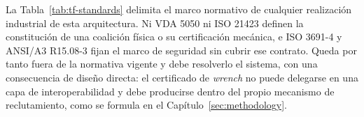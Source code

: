 

La Tabla~\ref{tab:tf-standards} delimita el marco normativo de cualquier realización
industrial de esta arquitectura. Ni VDA 5050 ni ISO 21423 definen la constitución de una
coalición física o su certificación mecánica, e ISO 3691-4 y ANSI/A3 R15.08-3 fijan el
marco de seguridad sin cubrir ese contrato. Queda por tanto fuera de la normativa
vigente y debe resolverlo el sistema, con una consecuencia de diseño directa: el
certificado de \emph{wrench} no puede delegarse en una capa de interoperabilidad y debe
producirse dentro del propio mecanismo de reclutamiento, como se formula en el
Capítulo~\ref{sec:methodology}.
